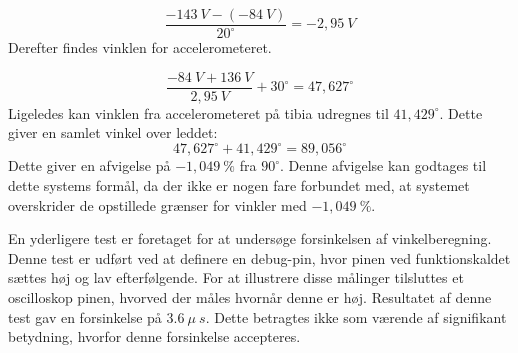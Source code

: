 \begin{equation}
\dfrac{-143~V-(-84~V)}{20^{\circ}}=-2,95~V
\end{equation}
Derefter findes vinklen for accelerometeret.

\begin{equation}
\dfrac{-84~V+136~V}{2,95~V}+30^{\circ}=47,627^{\circ}
\end{equation}
Ligeledes kan vinklen fra accelerometeret på tibia udregnes til $41,429^{\circ}$. Dette giver en samlet vinkel over leddet: 
%
\begin{equation}
47,627^{\circ}+41,429^{\circ}=89,056^{\circ}
\end{equation}
Dette giver en afvigelse på $-1,049~\%$ fra $90^{\circ}$. Denne afvigelse kan godtages til dette systems formål, da der ikke er nogen fare forbundet med, at systemet overskrider de opstillede grænser for vinkler med $-1,049~\%$.

\noindent
En yderligere test er foretaget for at undersøge forsinkelsen af vinkelberegning. Denne test er udført ved at definere en debug-pin, hvor pinen ved funktionskaldet sættes høj og lav efterfølgende. For at illustrere disse målinger tilsluttes et oscilloskop pinen, hvorved der måles hvornår denne er høj. Resultatet af denne test gav en forsinkelse på  $3.6~\mu~s$. Dette betragtes ikke som værende af signifikant betydning, hvorfor denne forsinkelse accepteres.